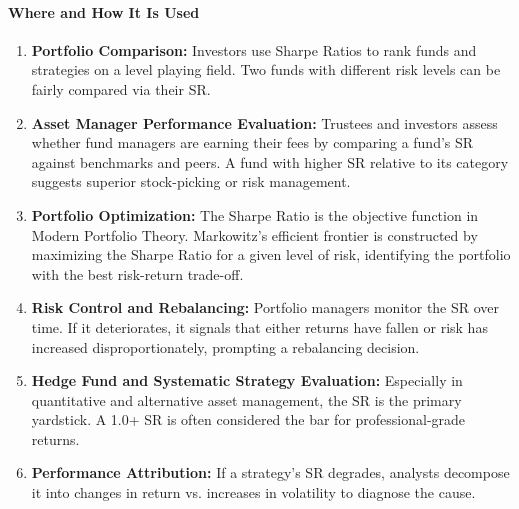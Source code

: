 \paragraph{Where and How It Is Used}
\begin{enumerate}
    \item \textbf{Portfolio Comparison:} Investors use Sharpe Ratios to rank funds and strategies on a level playing field. Two funds with different risk levels can be fairly compared via their SR.
    
    \item \textbf{Asset Manager Performance Evaluation:} Trustees and investors assess whether fund managers are earning their fees by comparing a fund's SR against benchmarks and peers. A fund with higher SR relative to its category suggests superior stock-picking or risk management.
    
    \item \textbf{Portfolio Optimization:} The Sharpe Ratio is the objective function in Modern Portfolio Theory. Markowitz's efficient frontier is constructed by maximizing the Sharpe Ratio for a given level of risk, identifying the portfolio with the best risk-return trade-off.
    
    \item \textbf{Risk Control and Rebalancing:} Portfolio managers monitor the SR over time. If it deteriorates, it signals that either returns have fallen or risk has increased disproportionately, prompting a rebalancing decision.
    
    \item \textbf{Hedge Fund and Systematic Strategy Evaluation:} Especially in quantitative and alternative asset management, the SR is the primary yardstick. A 1.0+ SR is often considered the bar for professional-grade returns.
    
    \item \textbf{Performance Attribution:} If a strategy's SR degrades, analysts decompose it into changes in return vs. increases in volatility to diagnose the cause.
\end{enumerate}

